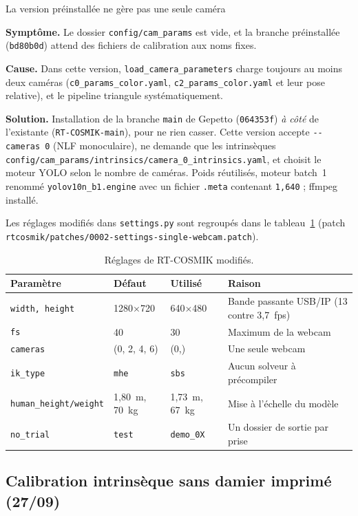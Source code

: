 \documentclass[11pt,a4paper]{article}
\newcommand{\symptome}[1]{\par\noindent\textbf{Symptôme.} #1}
\newcommand{\cause}[1]{\par\smallskip\noindent\textbf{Cause.} #1}
\newcommand{\solution}[1]{\par\smallskip\noindent\textbf{Solution.} #1}
\newcommand{\code}[1]{\texttt{\small #1}}
\begin{document}
\begin{probleme}{La version préinstallée ne gère pas une seule caméra}
\symptome{Le dossier \code{config/cam\_params} est vide, et la branche préinstallée (\code{bd80b0d}) attend des fichiers de calibration aux noms fixes.}
\cause{Dans cette version, \code{load\_camera\_parameters} charge toujours au moins deux caméras (\code{c0\_params\_color.yaml}, \code{c2\_params\_color.yaml} et leur pose relative), et le pipeline triangule systématiquement.}
\solution{Installation de la branche \code{main} de Gepetto (\code{064353f}) \emph{à côté} de l'existante (\code{RT-COSMIK-main}), pour ne rien casser. Cette version accepte \code{-{}-cameras 0} (NLF monoculaire), ne demande que les intrinsèques \code{config/cam\_params/intrinsics/camera\_0\_intrinsics.yaml}, et choisit le moteur YOLO selon le nombre de caméras. Poids réutilisés, moteur batch~1 renommé \code{yolov10n\_b1.engine} avec un fichier \code{.meta} contenant \code{1,640} ; ffmpeg installé.}
\end{probleme}

Les réglages modifiés dans \code{settings.py} sont regroupés dans le tableau~\ref{tab:settings} (patch \code{rtcosmik/patches/0002-settings-single-webcam.patch}).

\begin{table}[H]
\centering
\begin{tabular}{@{}lllp{5.6cm}@{}}
\toprule
\textbf{Paramètre} & \textbf{Défaut} & \textbf{Utilisé} & \textbf{Raison} \\
\midrule
\code{width, height} & 1280$\times$720 & 640$\times$480 & Bande passante USB/IP (13 contre 3,7~fps) \\
\code{fs} & 40 & 30 & Maximum de la webcam \\
\code{cameras} & (0, 2, 4, 6) & (0,) & Une seule webcam \\
\code{ik\_type} & \code{mhe} & \code{sbs} & Aucun solveur à précompiler \\
\code{human\_height/weight} & 1,80~m, 70~kg & 1,73~m, 67~kg & Mise à l'échelle du modèle \\
\code{no\_trial} & \code{test} & \code{demo\_0X} & Un dossier de sortie par prise \\
\bottomrule
\end{tabular}
\caption{Réglages de RT-COSMIK modifiés.}
\label{tab:settings}
\end{table}

\subsection{Calibration intrinsèque sans damier imprimé (27/09)}
\end{document}
